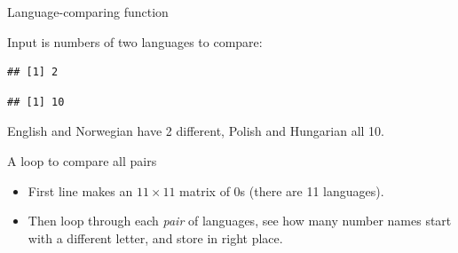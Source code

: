 \begin{frame}[fragile]{Language-comparing function}
  
  Input is numbers of two languages to compare:
  
\begin{knitrout}
\color{fgcolor}\begin{kframe}
\begin{alltt}
\hlkwb{=}\hlstd{(}\hlstd{,}\hlstd{)}
  \hlstd{\{}
    \hlkwb{=}\hlopt{!=}
  \hlstd{\}}

\hlstd{(}\hlstd{,}\hlstd{)}
\end{alltt}
\begin{verbatim}
## [1] 2
\end{verbatim}
\begin{alltt}
\hlstd{(}\hlstd{,}\hlstd{)}
\end{alltt}
\begin{verbatim}
## [1] 10
\end{verbatim}
\end{kframe}
\end{knitrout}

English and Norwegian have 2 different, Polish and Hungarian all 10.
  
\end{frame}

\begin{frame}[fragile]{A loop to compare all pairs}
  
    
\begin{knitrout}
\color{fgcolor}\begin{kframe}
\begin{alltt}
\hlkwb{=}\hlstd{(}\hlstd{,}\hlstd{,}\hlstd{)}
   \hlopt{:}\hlstd{)}
\hlstd{\{}
     \hlopt{:}\hlstd{)}
    \hlstd{\{}
      \hlkwb{=}
    \hlstd{\}}
\hlstd{\}}
\end{alltt}
\end{kframe}
\end{knitrout}

\begin{itemize}
\item First line makes an $11\times 11$ matrix of 0s (there are 11
  languages).
\item Then loop through each \emph{pair} of languages, see how many
  number names start with a different letter, and store in right place.
\end{itemize}
\end{frame}

